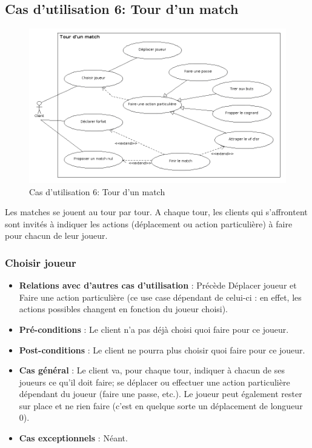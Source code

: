 \documentclass[a4paper,titlepage]{scrreprt}
\begin{document}
  \subsection{Cas d'utilisation 6: Tour d'un match}
  \begin{figure}[H]
    \center
    \includegraphics[scale=0.5]{uml/useCaseView/TourMatch.png}
    \caption{Cas d'utilisation 6: Tour d'un match}
  \end{figure}  
    Les matches se jouent au tour par tour. A chaque tour, les clients qui s'affrontent sont invités à indiquer les actions (déplacement ou action particulière) à faire pour chacun de leur joueur. %

    \subsubsection{Choisir joueur}
      \begin{itemize}
        \item \textbf{Relations avec d'autres cas d'utilisation}  : Précède Déplacer joueur et Faire une action particulière (ce use case dépendant de celui-ci : en effet, les actions possibles changent en fonction du joueur choisi).
        \item \textbf{Pré-conditions} : Le client n'a pas déjà choisi quoi faire pour ce joueur.
        \item \textbf{Post-conditions} : Le client ne pourra plus choisir quoi faire pour ce joueur.
        \item \textbf{Cas général} : Le client va, pour chaque tour, indiquer à chacun de ses joueurs ce qu'il doit faire; se déplacer ou effectuer une action particulière dépendant du joueur (faire une passe, etc.). Le joueur peut également rester sur place et ne rien faire (c'est en quelque sorte un déplacement de longueur 0).
        \item \textbf{Cas exceptionnels} : Néant.
      \end{itemize}
\end{document}
